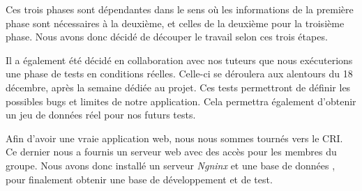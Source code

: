 \bigbreak

Ces trois phases sont dépendantes dans le sens où les informations de la première phase sont nécessaires à la deuxième, et celles de la deuxième pour la troisième phase. Nous avons donc décidé de découper le travail selon ces trois étapes. 

Il a également été décidé en collaboration avec nos tuteurs que nous exécuterions une phase de tests en conditions réelles. Celle-ci se déroulera aux alentours du 18 décembre, après la semaine dédiée au projet. Ces tests permettront de définir les possibles bugs et limites de notre application. Cela permettra également d'obtenir un jeu de données réel pour nos futurs tests.


\bigbreak

Afin d'avoir une vraie application web, nous nous sommes tournés vers le CRI. Ce dernier nous a fournis un serveur web avec des accès pour les membres du groupe. Nous avons donc installé un serveur \textit{Ngninx} et une base de données \mdb, pour finalement obtenir une base de développement et de test.